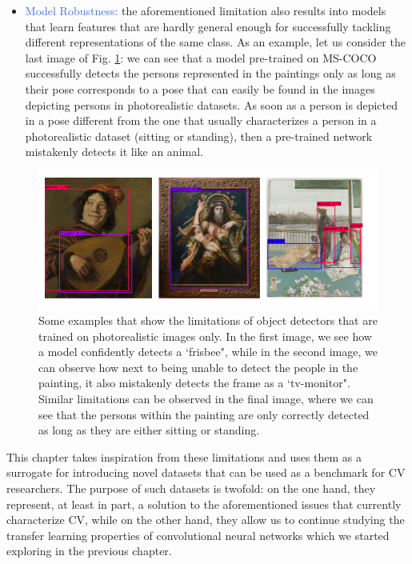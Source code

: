 \begin{itemize}
	\item \textcolor{RoyalBlue}{Model Robustness:} the aforementioned limitation also results into models that learn features that are hardly general enough for successfully tackling different representations of the same class. As an example, let us consider the last image of Fig. \ref{fig:fails}: we can see that a model pre-trained on MS-COCO successfully detects the persons represented in the paintings only as long as their pose corresponds to a pose that can easily be found in the images depicting persons in photorealistic datasets. As soon as a person is depicted in a pose different from the one that usually characterizes a person in a photorealistic dataset (sitting or standing), then a pre-trained network mistakenly detects it like an animal.   
\end{itemize}

\begin{figure}[ht!]
\centering
  \includegraphics[width=\linewidth]{./Images/Chapter05/fails}
  \caption{Some examples that show the limitations of object detectors that are trained on photorealistic images only. In the first image, we see how a model confidently detects a `frisbee", while in the second image, we can observe how next to being unable to detect the people in the painting, it also mistakenly detects the frame as a `tv-monitor". Similar limitations can be observed in the final image, where we can see that the persons within the painting are only correctly detected as long as they are either sitting or standing.}
  \label{fig:fails}
\end{figure}

This chapter takes inspiration from these limitations and uses them as a surrogate for introducing novel datasets that can be used as a benchmark for CV researchers. The purpose of such datasets is twofold: on the one hand, they represent, at least in part, a solution to the aforementioned issues that currently characterize CV, while on the other hand, they allow us to continue studying the transfer learning properties of convolutional neural networks which we started exploring in the previous chapter.  

